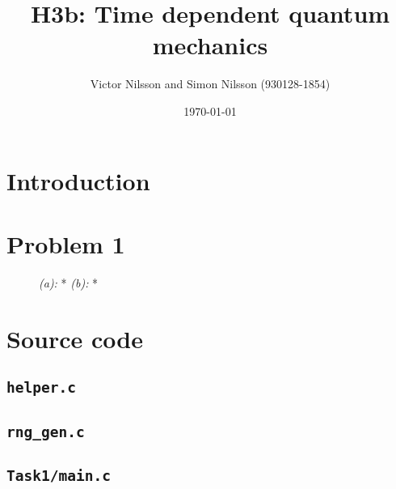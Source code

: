 



\title{H3b: Time dependent quantum mechanics}
\author{Victor Nilsson and Simon Nilsson (930128-1854)}
\date{\today}





\section*{Introduction}

\section*{Problem 1}

\begin{figure}[H]
    \centering
    \captionsetup[subfigure]{justification=centering}
    \begin{subfigure}[b]{0.7\textwidth}
        \centering
		\caption{}
		\label{fig:*_a}
    \end{subfigure}
    \begin{subfigure}[b]{0.7\textwidth}
        \centering
        \caption{}
		\label{fig:*_b}
    \end{subfigure}
    \caption{\textit{(a):} * \textit{(b):} *}
    \label{fig:*}
\end{figure}




\appendix
\section{Source code}
\subsection{\texttt{helper.c}}
%

\subsection{\texttt{rng\_gen.c}}
%

\subsection{\texttt{Task1/main.c}}
%

